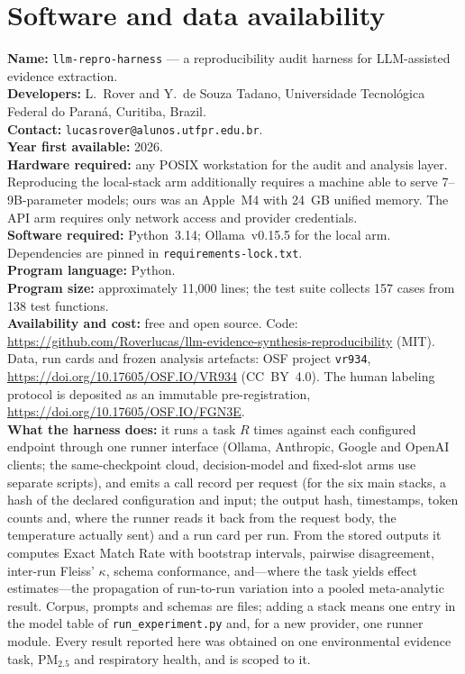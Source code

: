 \documentclass[preprint,review,12pt,authoryear]{elsarticle}
\begin{document}
\section*{Software and data availability}

\noindent\textbf{Name:} \texttt{llm-repro-harness} --- a reproducibility audit harness for LLM-assisted
evidence extraction.\\
\textbf{Developers:} L.\ Rover and Y.\ de Souza Tadano, Universidade Tecnol\'ogica Federal do Paran\'a,
Curitiba, Brazil.\\
\textbf{Contact:} \texttt{lucasrover@alunos.utfpr.edu.br}.\\
\textbf{Year first available:} 2026.\\
\textbf{Hardware required:} any POSIX workstation for the audit and analysis layer. Reproducing the
local-stack arm additionally requires a machine able to serve 7--9B-parameter models; ours was an
Apple~M4 with 24~GB unified memory. The API arm requires only network access and provider credentials.\\
\textbf{Software required:} Python~3.14; Ollama~v0.15.5 for the local arm. Dependencies are pinned in
\texttt{requirements-lock.txt}.\\
\textbf{Program language:} Python.\\
\textbf{Program size:} approximately 11{,}000 lines; the test suite collects 157 cases from 138 test functions.\\
\textbf{Availability and cost:} free and open source. Code:
\url{https://github.com/Roverlucas/llm-evidence-synthesis-reproducibility} (MIT). Data, run cards and
frozen analysis artefacts: OSF project \texttt{vr934}, \url{https://doi.org/10.17605/OSF.IO/VR934}
(CC~BY~4.0). The human labeling protocol is deposited as an immutable pre-registration,
\url{https://doi.org/10.17605/OSF.IO/FGN3E}.\\
\textbf{What the harness does:} it runs a task $R$ times against each configured endpoint through one runner interface (Ollama,
Anthropic, Google and OpenAI clients; the same-checkpoint cloud, decision-model and fixed-slot arms use separate
scripts), and emits a call record per request (for the six main stacks, a hash of the declared configuration
and input; the output hash, timestamps, token counts and, where the runner reads it back from the request
body, the temperature actually sent) and a run card per run. From the stored outputs it computes Exact Match Rate with bootstrap intervals, pairwise
disagreement, inter-run Fleiss' $\kappa$, schema conformance, and---where the task yields effect
estimates---the propagation of run-to-run variation into a pooled meta-analytic result. Corpus, prompts
and schemas are files; adding a stack means one entry in the model table of \texttt{run\_experiment.py}
and, for a new provider, one runner module. Every result reported here was obtained on one environmental
evidence task, PM$_{2.5}$ and respiratory health, and is scoped to it.
\end{document}
